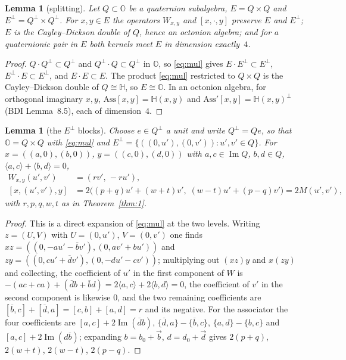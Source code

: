 \documentclass{baustms}
\theoremstyle{cupthm}
\newtheorem{lemma}[thm]{Lemma}
\numberwithin{equation}{section}
\newcommand{\Ass}{\mathrm{Ass}}
\newcommand{\HH}{\mathbb{H}}
\newcommand{\OO}{\mathbb{O}}
\newcommand{\Imm}{\operatorname{Im}}
\begin{document}
\begin{lemma}[splitting]\label{lem:B}
Let $Q\subset\OO$ be a quaternion subalgebra, $E=Q\times Q$ and $E^\perp=Q^\perp\times Q^\perp$. For $x,y\in E$ the operators $W_{x,y}$ and $[x,\cdot,y]$ preserve $E$ and $E^\perp$; $E$ is the Cayley--Dickson double of $Q$, hence an octonion algebra; and for a quaternionic pair in $E$ both kernels meet $E$ in dimension exactly~$4$.
\end{lemma}

\begin{proof}
$Q\cdot Q^\perp\subset Q^\perp$ and $Q^\perp\cdot Q\subset Q^\perp$ in $\OO$, so \eqref{eq:mul} gives $E\cdot E^\perp\subset E^\perp$, $E^\perp\cdot E\subset E^\perp$, and $E\cdot E\subset E$. The product \eqref{eq:mul} restricted to $Q\times Q$ is the Cayley--Dickson double of $Q\cong\HH$, so $E\cong\OO$. In an octonion algebra, for orthogonal imaginary $x,y$, $\Ass[x,y]=\HH(x,y)$ and $\Ass'[x,y]=\HH(x,y)^\perp$ (BDI Lemma~8.5), each of dimension~$4$.
\end{proof}

\begin{lemma}[the $E^\perp$ blocks]\label{lem:C}
Choose $e\in Q^\perp$ a unit and write $Q^\perp=Qe$, so that $\OO=Q\times Q$ with \eqref{eq:mul} and $E^\perp=\{((0,u'),(0,v')):u',v'\in Q\}$. For $x=((a,0),(b,0))$, $y=((c,0),(d,0))$ with $a,c\in\Imm Q$, $b,d\in Q$, $\langle a,c\rangle+\langle b,d\rangle=0$,
\begin{align*}
W_{x,y}(u',v')&=(rv',\,-ru'),\\
[x,(u',v'),y]&=2\bigl((p+q)u'+(w+t)v',\;(w-t)u'+(p-q)v'\bigr)=2M(u',v'),
\end{align*}
with $r,p,q,w,t$ as in Theorem~\ref{thm:1}.
\end{lemma}

\begin{proof}
This is a direct expansion of \eqref{eq:mul} at the two levels. Writing $z=(U,V)$ with $U=(0,u')$, $V=(0,v')$ one finds $xz=((0,-au'-\overline{b}v'),(0,av'+bu'))$ and $zy=((0,cu'+\overline{d}v'),(0,-du'-cv'))$; multiplying out $(xz)y$ and $x(zy)$ and collecting, the coefficient of $u'$ in the first component of $W$ is $-(ac+ca)+(\overline{d}b+\overline{b}d)=2\langle a,c\rangle+2\langle b,d\rangle=0$, the coefficient of $v'$ in the second component is likewise $0$, and the two remaining coefficients are $[\overline{b},c]+[\overline{d},a]=[c,b]+[a,d]=r$ and its negative. For the associator the four coefficients are $[a,c]+2\Imm(\overline{d}b)$, $\{\overline{d},a\}-\{\overline{b},c\}$, $\{a,d\}-\{b,c\}$ and $[a,c]+2\Imm(d\overline{b})$; expanding $b=b_0+\vec{b}$, $d=d_0+\vec{d}$ gives $2(p+q)$, $2(w+t)$, $2(w-t)$, $2(p-q)$.
\end{proof}
\end{document}
